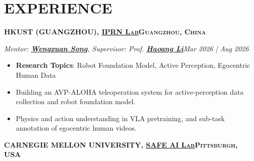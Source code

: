 \documentclass[a4paper,9pt]{extarticle}
\begin{document}

\section*{{\textbf{\fontsize{14pt}{8pt}\selectfont E}\textbf{\scshape XPERIENCE}}}
{\textbf{\fontsize{12pt}{4pt}\selectfont H}\textbf{\scshape KUST (GUANGZHOU), {\href{https://sites.google.com/view/haoangli/homepage }{IPRN Lab}}\hfill Guangzhou, China}}
\par\textit{Mentor: {\href{https://songwxuan.github.io/}{\textbf{Wengxuan Song}}}, Supervisor: Prof. {\href{https://sites.google.com/view/haoangli/homepage}{\textbf{Haoang Li}}}\hfill Mar 2026 | Aug 2026}  %
\begin{itemize}
    \item \textbf{Research Topics}: Robot Foundation Model, Active Perception, Egocentric Human Data
    \item Building an AVP-ALOHA teleoperation system for active-perception data collection and robot foundation model.
    \item Physics and action understanding in VLA pretraining, and sub-task annotation of egocentric human videos.
\end{itemize}
{\textbf{\fontsize{12pt}{4pt}\selectfont C}\textbf{\scshape ARNEGIE MELLON UNIVERSITY, {\href{https://safeai-lab.github.io/}{SAFE AI Lab}}\hfill Pittsburgh, USA}}
\end{document}
